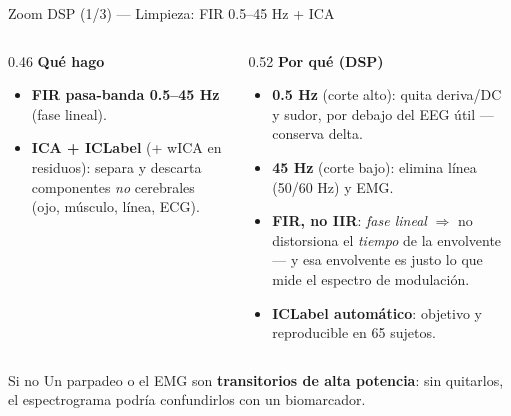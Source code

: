 \documentclass[aspectratio=169, 11pt]{beamer}
\begin{document}
\begin{frame}{Zoom DSP (1/3) --- Limpieza: FIR 0.5--45 Hz + ICA}

\begin{columns}[T]
\begin{column}{0.46\textwidth}
\small\textbf{Qué hago}
\begin{itemize}
    \item \textbf{FIR pasa-banda 0.5--45 Hz} (fase lineal).
    \item \textbf{ICA + ICLabel} (+ wICA en residuos): separa y descarta
    componentes \emph{no} cerebrales (ojo, músculo, línea, ECG).
\end{itemize}
\end{column}
\begin{column}{0.52\textwidth}
\small\textbf{Por qué (DSP)}
\begin{itemize}
    \item \textbf{0.5 Hz} (corte alto): quita deriva/DC y sudor, por
    debajo del EEG útil --- conserva delta.
    \item \textbf{45 Hz} (corte bajo): elimina línea (50/60 Hz) y EMG.
    \item \textbf{FIR, no IIR}: \emph{fase lineal} $\Rightarrow$ no
    distorsiona el \emph{tiempo} de la envolvente --- y esa envolvente es
    justo lo que mide el espectro de modulación.
    \item \textbf{ICLabel automático}: objetivo y reproducible en 65
    sujetos.
\end{itemize}
\end{column}
\end{columns}

\vfill
\begin{alertblock}{Si no}
\small Un parpadeo o el EMG son \textbf{transitorios de alta potencia}: sin
quitarlos, el espectrograma podría confundirlos con un biomarcador.
\end{alertblock}

\end{frame}
\end{document}
